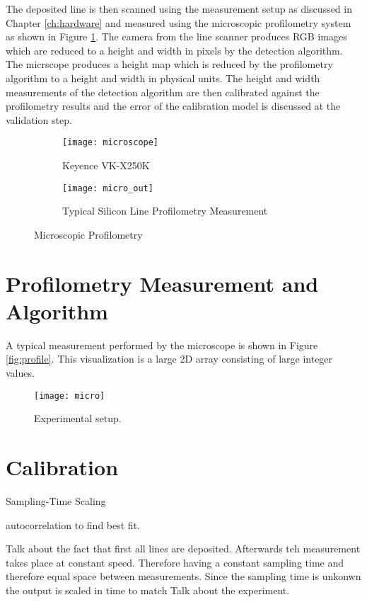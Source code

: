 The deposited line is then scanned using the measurement setup as discussed in Chapter \ref{ch:hardware} and measured using the microscopic profilometry system as shown in Figure \ref{fig: keyence}. The camera from the line scanner produces RGB images which are reduced to a height and width in pixels by the detection algorithm. The micrscope produces a height map which is reduced by the profilometry algorithm to a height and width in physical units. The height and width measurements of the detection algorithm are then calibrated against the profilometry results and the error of the calibration model is discussed at the validation step. 
\begin{figure}[ht]
\begin{subfigure}{0.25\textwidth}
\centering
\texttt{[image: microscope]} 
\caption{Keyence VK-X250K}
\label{fig: keyence}
\end{subfigure}
\begin{subfigure}{0.75\textwidth}
\centering
\texttt{[image: micro\_out]}
\caption{Typical Silicon Line Profilometry Measurement}
\label{fig:profile2}
\end{subfigure}
\caption{Microscopic Profilometry}
\label{fig:}
\end{figure}

\section{Profilometry Measurement and Algorithm}

A typical measurement performed by the microscope is shown in Figure \ref{fig:profile}. This visualization is a large 2D array consisting of large integer values. 

\begin{figure}[ht]
\centering
\texttt{[image: micro]} 
\caption{Experimental setup.}
\label{fig: setup}
\end{figure}

\blindtext[2]

\section{Calibration}

Sampling-Time Scaling

autocorrelation to find best fit.


Talk about the fact that first all lines are deposited. Afterwards teh measurement takes place at constant speed. Therefore having a constant sampling time and therefore equal space between measurements. Since the sampling time is unkonwn the output is scaled in time to match 
Talk about the experiment. 

